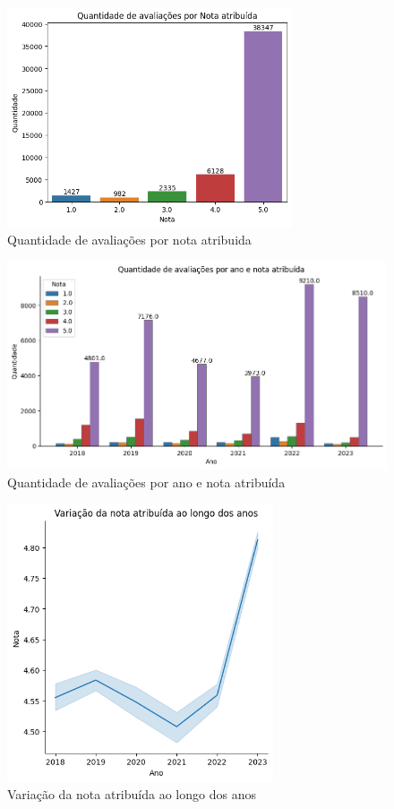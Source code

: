 \begin{figure}
	\centering
	\includegraphics[width=0.75\textwidth]{figs/exploratoria/quantidade_avaliacao_nota_atribuida.png}
	\caption{Quantidade de avaliações por nota atribuida}
	\label{img:dist_review_rating}
\end{figure}

\begin{figure}
	\centering
	\includegraphics[width=1\textwidth]{figs/exploratoria/quantidade_avaliacao_nota_atribuida_ano.png}
	\caption{Quantidade de avaliações por ano e nota atribuída}
	\label{img:dist_review_rating_per_year}
\end{figure}

\begin{figure}
	\centering
	\includegraphics[width=0.70\textwidth]{figs/exploratoria/relplot_ano_rating.png}
	\caption{Variação da nota atribuída ao longo dos anos}
	\label{img:relplot_ano_rating}
\end{figure}

